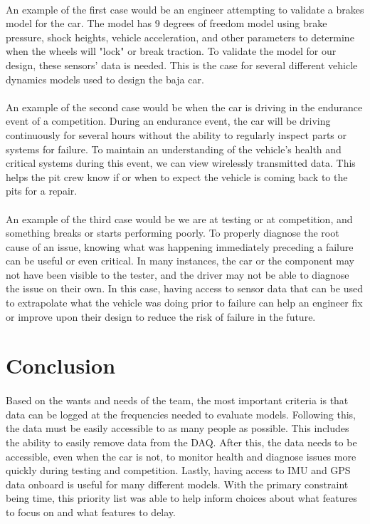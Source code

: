\paragraph{}
An example of the first case would be an engineer attempting to validate a brakes model for the car.
The model has 9 degrees of freedom model using brake pressure, shock heights, vehicle acceleration, and other parameters to determine when the wheels will "lock" or break traction.
To validate the model for our design, these sensors' data is needed.
This is the case for several different vehicle dynamics models used to design the baja car.

\paragraph{}
An example of the second case would be when the car is driving in the endurance event of a competition.
During an endurance event, the car will be driving continuously for several hours without the ability to regularly inspect parts or systems for failure.
To maintain an understanding of the vehicle's health and critical systems during this event, we can view wirelessly transmitted data.
This helps the pit crew know if or when to expect the vehicle is coming back to the pits for a repair.

\paragraph{}
An example of the third case would be we are at testing or at competition, and something breaks or starts performing poorly.
To properly diagnose the root cause of an issue, knowing what was happening immediately preceding a failure can be useful or even critical.
In many instances, the car or the component may not have been visible to the tester, and the driver may not be able to diagnose the issue on their own.
In this case, having access to sensor data that can be used to extrapolate what the vehicle was doing prior to failure can help an engineer fix or improve upon their design to reduce the risk of failure in the future.

\section{Conclusion}

\paragraph{}
Based on the wants and needs of the team, the most important criteria is that data can be logged at the frequencies needed to evaluate models.
Following this, the data must be easily accessible to as many people as possible.
This includes the ability to easily remove data from the DAQ.
After this, the data needs to be accessible, even when the car is not, to monitor health and diagnose issues more quickly during testing and competition.
Lastly, having access to IMU and GPS data onboard is useful for many different models.
With the primary constraint being time, this priority list was able to help inform choices about what features to focus on and what features to delay.